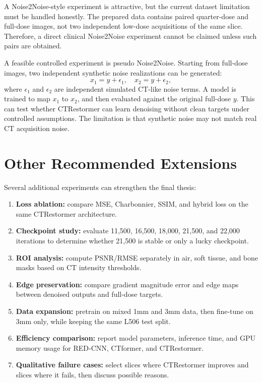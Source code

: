\documentclass[12pt,a4paper]{report}
\begin{document}
A Noise2Noise-style experiment is attractive, but the current dataset limitation must be handled honestly. The prepared data contains paired quarter-dose and full-dose images, not two independent low-dose acquisitions of the same slice. Therefore, a direct clinical Noise2Noise experiment cannot be claimed unless such pairs are obtained.

A feasible controlled experiment is pseudo Noise2Noise. Starting from full-dose images, two independent synthetic noise realizations can be generated:
\[
x_1 = y + \epsilon_1,\quad x_2 = y + \epsilon_2,
\]
where \(\epsilon_1\) and \(\epsilon_2\) are independent simulated CT-like noise terms. A model is trained to map \(x_1\) to \(x_2\), and then evaluated against the original full-dose \(y\). This can test whether CTRestormer can learn denoising without clean targets under controlled assumptions. The limitation is that synthetic noise may not match real CT acquisition noise.

\section{Other Recommended Extensions}

Several additional experiments can strengthen the final thesis:

\begin{enumerate}[leftmargin=*]
\item \textbf{Loss ablation:} compare MSE, Charbonnier, SSIM, and hybrid loss on the same CTRestormer architecture.
\item \textbf{Checkpoint study:} evaluate 11,500, 16,500, 18,000, 21,500, and 22,000 iterations to determine whether 21,500 is stable or only a lucky checkpoint.
\item \textbf{ROI analysis:} compute PSNR/RMSE separately in air, soft tissue, and bone masks based on CT intensity thresholds.
\item \textbf{Edge preservation:} compare gradient magnitude error and edge maps between denoised outputs and full-dose targets.
\item \textbf{Data expansion:} pretrain on mixed 1mm and 3mm data, then fine-tune on 3mm only, while keeping the same L506 test split.
\item \textbf{Efficiency comparison:} report model parameters, inference time, and GPU memory usage for RED-CNN, CTformer, and CTRestormer.
\item \textbf{Qualitative failure cases:} select slices where CTRestormer improves and slices where it fails, then discuss possible reasons.
\end{enumerate}
\end{document}
